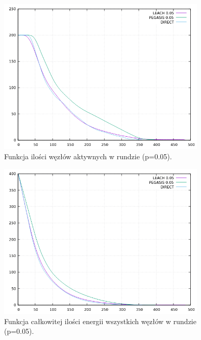 \documentclass[a4paper,12pt,twoside,openany]{report}
\begin{document}
\begin{figure}[H]
 \centering
 \includegraphics[width=10cm]{images/gnuplot/test_4/nodes_in_round_p005.png}
 \caption{Funkcja ilości węzłów aktywnych w rundzie (p=0.05).}
\end{figure}

\begin{figure}[H]
 \centering
 \includegraphics[width=10cm]{images/gnuplot/test_4/energy_in_round_p005.png}
 \caption{Funkcja całkowitej ilości energii wszystkich węzłów w rundzie (p=0.05).}
\end{figure}
\end{document}
